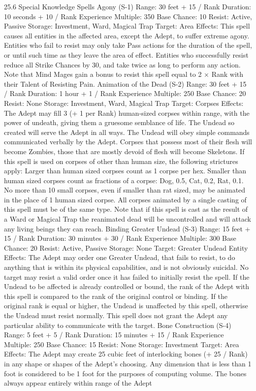 \documentclass[a4paper]{article}
\begin{document}
\begin{multicols}{3}
25.6 Special Knowledge Spells
Agony (S-1)
Range: 30 feet + 15 / Rank
Duration: 10 seconds + 10 / Rank
Experience Multiple: 350
Base Chance: 10%
Resist: Active, Passive
Storage: Investment, Ward, Magical Trap
Target: Area
Effects: This spell causes all entities in the affected
area, except the Adept, to suffer extreme agony.
Entities who fail to resist may only take Pass actions for the duration of the spell, or until such time
as they leave the area of effect. Entities who successfully resist reduce all Strike Chances by 30,
and take twice as long to perform any action. Note
that Mind Mages gain a bonus to resist this spell
equal to 2 × Rank with their Talent of Resisting
Pain.
Animation of the Dead (S-2)
Range: 30 feet + 15 / Rank
Duration: 1 hour + 1 / Rank
Experience Multiple: 250
Base Chance: 20%
Resist: None
Storage: Investment, Ward, Magical Trap
Target: Corpses
Effects: The Adept may fill 3 (+ 1 per Rank) human-sized corpses within range, with the power of
undeath, giving them a gruesome semblance of
life. The Undead so created will serve the Adept in
all ways. The Undead will obey simple commands
communicated verbally by the Adept. Corpses that
possess most of their flesh will become Zombies,
those that are mostly devoid of flesh will become
Skeletons. If this spell is used on corpses of other
than human size, the following strictures apply:
Larger than human sized corpses count as 1 corpse
per hex. Smaller than human sized corpses count as
fractions of a corpse: Dog, 0.5, Cat, 0.2, Rat, 0.1.
No more than 10 small corpses, even if smaller
than rat sized, may be animated in the place of 1
human sized corpse. All corpses animated by a
single casting of this spell must be of the same
type. Note that if this spell is cast as the result of a
Ward or Magical Trap the reanimated dead will be
uncontrolled and will attack any living beings they
can reach.
Binding Greater Undead (S-3)
Range: 15 feet + 15 / Rank
Duration: 30 minutes + 30 / Rank
Experience Multiple: 300
Base Chance: 20%
Resist: Active, Passive
Storage: None
Target: Greater Undead Entity
Effects: The Adept may order one Greater Undead,
that fails to resist, to do anything that is within its
physical capabilities, and is not obviously suicidal.
No target may resist a valid order once it has failed
to initially resist the spell. If the Undead to be
affected is already controlled or bound, the rank of
the Adept with this spell is compared to the rank of
the original control or binding. If the original rank
is equal or higher, the Undead is unaffected by this
spell, otherwise the Undead must resist normally.
This spell does not grant the Adept any particular
ability to communicate with the target.
Bone Construction (S-4)
Range: 5 feet + 5 / Rank
Duration: 15 minutes + 15 / Rank
Experience Multiple: 250
Base Chance: 15%
Resist: None
Storage: Investment
Target: Area
Effects: The Adept may create 25 cubic feet of
interlocking bones (+ 25 / Rank) in any shape or
shapes of the Adept’s choosing. Any dimension
that is less than 1 foot is considered to be 1 foot for
the purposes of computing volume. The bones
always appear entirely within range of the Adept


\end{multicols}
\end{document}
